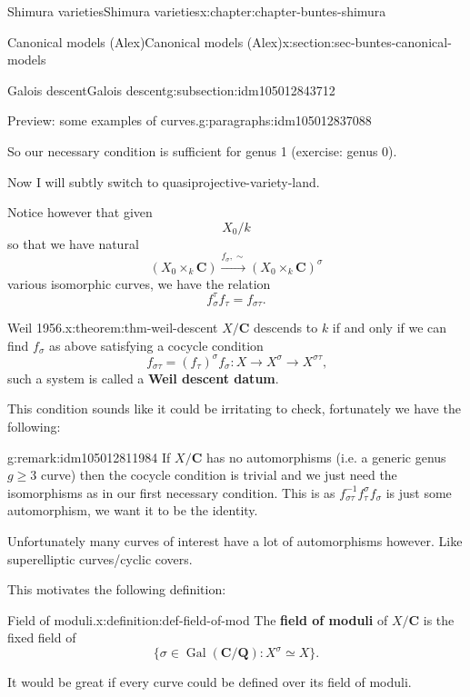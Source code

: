 \documentclass[oneside,10pt,]{book}
\newcommand{\terminology}[1]{\textbf{#1}}
\numberwithin{equation}{section}
\newcommand{\inv}{^{-1}}
\newcommand{\QQ}{\mathbf{Q}}
\newcommand{\CC}{\mathbf{C}}
\newcommand{\Gal}[2]{\operatorname{Gal}(#1/#2)}
\begin{document}
\begin{chapterptx}{Shimura varieties}{}{Shimura varieties}{}{}{x:chapter:chapter-buntes-shimura}
\begin{sectionptx}{Canonical models (Alex)}{}{Canonical models (Alex)}{}{}{x:section:sec-buntes-canonical-models}
\begin{subsectionptx}{Galois descent}{}{Galois descent}{}{}{g:subsection:idm105012843712}
\begin{paragraphs}{Preview: some examples of curves.}{g:paragraphs:idm105012837088}
\par
So our necessary condition is sufficient for genus 1 (exercise: genus 0).%
\end{paragraphs}%
\par
Now I will subtly switch to quasiprojective-variety-land.%
\par
Notice however that given%
\begin{equation*}
X_0/k
\end{equation*}
so that we have natural%
\begin{equation*}
(X_0 \times_k \CC) \xrightarrow{f_\sigma,\sim} (X_0 \times_k \CC)^\sigma
\end{equation*}
various isomorphic curves, we have the relation%
\begin{equation*}
f_\sigma^\tau f_\tau = f_{\sigma\tau}\text{.}
\end{equation*}
%
\begin{theorem}{Weil 1956.}{}{x:theorem:thm-weil-descent}%
\(X/\CC\) descends to \(k\) if and only if we can find \(f_\sigma\) as above satisfying a cocycle condition%
\begin{equation*}
f_{\sigma\tau} = (f_\tau)^\sigma f_\sigma\colon X \to X^\sigma \to X^{\sigma\tau}\text{,}
\end{equation*}
such a system is called a \terminology{Weil descent datum}.%
\end{theorem}
This condition sounds like it could be irritating to check, fortunately we have the following:%
\begin{remark}{}{g:remark:idm105012811984}%
If \(X/\CC\) has no automorphisms (i.e. a generic genus \(g \ge 3\) curve) then the cocycle condition is trivial and we just need the isomorphisms as in our first necessary condition. This is as \(f_{\sigma\tau}\inv f_\tau ^\sigma f_\sigma\) is just some automorphism, we want it to be the identity.%
\par
Unfortunately many curves of interest have a lot of automorphisms however. Like superelliptic curves\slash{}cyclic covers.%
\end{remark}
This motivates the following definition:%
\begin{definition}{Field of moduli.}{x:definition:def-field-of-mod}%
The \terminology{field of moduli} of \(X/\CC\) is the fixed field of%
\begin{equation*}
\{\sigma \in \Gal{\CC}{\QQ} : X^\sigma \simeq X\}\text{.}
\end{equation*}
%
\end{definition}
It would be great if every curve could be defined over its field of moduli.%

\end{subsectionptx}
\end{sectionptx}
\end{chapterptx}
\end{document}
